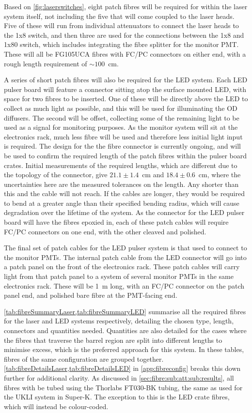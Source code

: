 \documentclass[a4paper,11pt]{article}
\let\oldsim\sim
\renewcommand{\sim}{{\oldsim}}
\begin{document}
Based on \cref{fig:laserswitches}, eight patch fibres will be required for within the laser system itself, not including the five that will come coupled to the laser heads. Five of these will run from individual attenuators to connect the laser heads to the 1x8 switch, and then three are used for the connections between the 1x8 and 1x80 switch, which includes integrating the fibre splitter for the monitor PMT. These will all be FG105UCA fibres with FC/PC connectors on either end, with a rough length requirement of $\sim100$~cm.

A series of short patch fibres will also be required for the LED system. Each LED pulser board will feature a connector sitting atop the surface mounted LED, with space for two fibres to be inserted. One of these will be directly above the LED to collect as much light as possible, and this will be used for illuminating the OD diffusers. The second will be offset, collecting some of the remaining light to be used as a signal for monitoring purposes. As the monitor system will sit at the electronics rack, much less fibre will be used and therefore less initial light input is required. The design for the the fibre connector is currently ongoing, and will be used to confirm the required length of the patch fibres within the pulser board crates. Initial measurements of the required lengths, which are different due to the topology of the connector, give $21.1\pm1.4$~cm and $18.4\pm0.6$~cm, where the uncertainties here are the measured tolerances on the length. Any shorter than this and the cable will not reach. If the cables are longer, they would be required to bend at a greater angle than their specified bending radius, which will cause degradation over the lifetime of the system. As the connector for the LED pulser board will have the fibres epoxied in, each of these patch cables will require FC/PC connectors on one end, with the other cleaved and polished.

The final set of patch cables for the LED pulser system is that used to connect to the monitor PMTs. The internal patch cable from the LED connector will go into a patch panel on the front of the electronics rack. These patch cables will carry light from that patch panel to a system of several monitor PMTs in the same electronics rack. These will be 1~m long, with an FC/PC connector on the patch panel end, and polished bare fibre at the PMT-facing end.

\cref{tab:fibreSummaryLaser,tab:fibreSummaryLED} summarise all the required fibres for the laser and LED systems respectively, detailing the chosen type, length, connectors and quantities needed. Quantities are also detailed for the cases where the fibres that traverse the barrel region are split into different lengths to minimise excess, which is the preferred approach for this system. In these tables, fibres of the same configuration are grouped together. \cref{tab:fibreDetailsLaser,tab:fibreDetailsLED} in \cref{app:fibreconfig} breaks this down further for additional clarity. As discussed in \cref{sec:fibre:sub:att:sub:results}, all fibres with be tubed using the Thorlabs FT030-BK tubing, the same as used for the UKLI system in Super-K. The exception to this is the LED crate fibres, which will instead be colour-coded.
\end{document}
